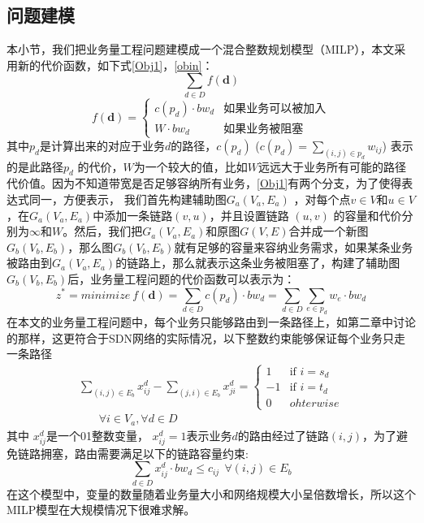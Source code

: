 \subsection{问题建模}
本小节，我们把业务量工程问题建模成一个混合整数规划模型（MILP），本文采用新的代价函数，如下式\ref{Obj1}，\ref{obin}：
\begin{equation}\label{Obj1}
\sum\limits_{d \in D} f(\mathbf{d})
\end{equation}
\begin{equation}\label{obin}
f(\mathbf{d})=\begin{cases}
c(p_d) \cdot bw_{d} & \text{如果业务可以被加入}\\
W \cdot bw_{d}& \text{如果业务被阻塞}
\end{cases}
\end{equation}
其中$p_d$是计算出来的对应于业务$d$的路径，$c(p_d)$ ($c(p_d) = \sum_{(i,j)\in p_d} w_{ij}$) 表示的是此路径$p_d$ 的代价，$W$为一个较大的值，比如$W$远远大于业务所有可能的路径代价值。因为不知道带宽是否足够容纳所有业务，\ref{Obj1}有两个分支，为了使得表达式同一，方便表示，
我们首先构建辅助图$G_a(V_a, E_a)$ ，对每个点$v \in V$和$u \in V$，在$G_a(V_a,E_a)$中添加一条链路$(v,u)$，并且设置链路 $(u,v)$ 的容量和代价分别为$\infty$和$W$。然后，我们把$G_a(V_a,E_a)$和原图$G(V,E)$合并成一个新图$G_b(V_b,E_b)$，那么图$G_b(V_b,E_b)$就有足够的容量来容纳业务需求，如果某条业务被路由到$G_a(V_a, E_a)$的链路上，那么就表示这条业务被阻塞了，构建了辅助图$G_b(V_b, E_b)$后，业务量工程问题的代价函数可以表示为：
\begin{equation}\label{Obj2}
z^* = minimize~f(\mathbf{d})=
\sum\limits_{d \in D} c(p_d)\cdot bw_d= \sum\limits_{d \in D}\sum\limits_{e \in p_d} w_e \cdot bw_d
\end{equation}
在本文的业务量工程问题中，每个业务只能够路由到一条路径上，如第二章中讨论的那样，这更符合于SDN网络的实际情况，以下整数约束能够保证每个业务只走一条路径
\begin{equation}\label{FlowConv}
\begin{split}
\sum\limits_{(i,j) \in E_b} x_{ij}^d - \sum\limits_{(j,i) \in E_b} x_{ji}^d
=\begin{cases}
1 & \text{if $i = s_d$}\\
-1 & \text{if $i = t_d$} \\
0 &{ohterwise}
\end{cases}
\\~~~~~~~~\forall i\in V_a, \forall d\in D
\end{split}
\end{equation}
\vspace{-0.4cm}
其中 $x_{ij}^d$是一个01整数变量， $x_{ij}^d=1$表示业务$d$的路由经过了链路$(i,j)$，为了避免链路拥塞，路由需要满足以下的链路容量约束:
\begin{equation}\label{Capcon}
\sum\limits_{d \in D}x_{ij}^d \cdot bw_d \le c_{ij} ~~\forall (i,j)\in E_b
\end{equation}
在这个模型中，变量的数量随着业务量大小和网络规模大小呈倍数增长，所以这个MILP模型在大规模情况下很难求解。
